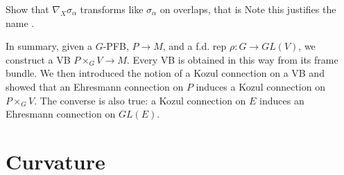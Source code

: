 \documentclass{article}
\begin{document}
\begin{ex}
Show that $\nabla_X \sigma_\alpha$ transforms like $\sigma_ \alpha$ on overlaps, that is 
Note this justifies the name . 
\end{ex}

In summary, given a $G$-PFB, $P \to M$, and a f.d. rep $\rho : G \to GL(V)$, we construct a VB $P\times_G V \to M$. Every VB is obtained in this way from its frame bundle. We then introduced the notion of a Kozul connection on a VB and showed that an Ehresmann connection on $P$ induces a Kozul connection on $P \times_G V$. The converse is also true: a Kozul connection on $E$ induces an Ehresmann connection on $GL(E)$. 

\section{Curvature}
\end{document}
